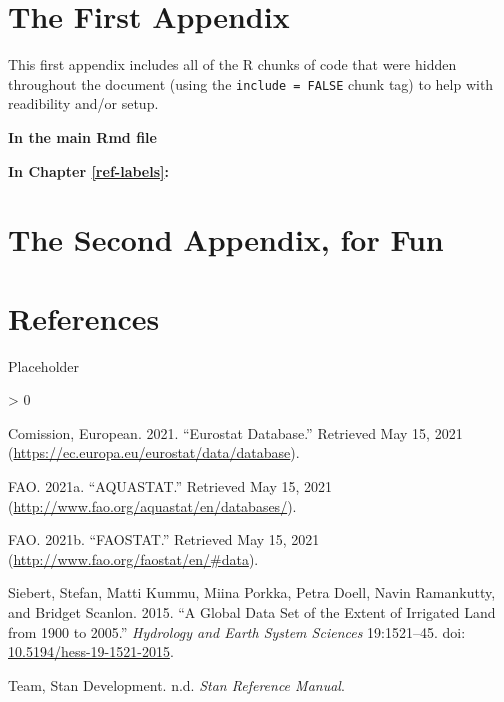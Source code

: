 \documentclass[12pt,twoside]{reedthesis}
\newlength{\cslhangindent}
\newenvironment{CSLReferences}[2] %
 {%
  \setlength{\parindent}{0pt}
  \ifodd #1 \everypar{\setlength{\hangindent}{\cslhangindent}}\ignorespaces\fi
  \ifnum #2 > 0
  \setlength{\parskip}{#2\baselineskip}
  \fi
 }%
 {}
\begin{document}
\appendix

\hypertarget{the-first-appendix}{%
\chapter{The First Appendix}\label{the-first-appendix}}

This first appendix includes all of the R chunks of code that were hidden throughout the document (using the \texttt{include\ =\ FALSE} chunk tag) to help with readibility and/or setup.

\textbf{In the main Rmd file}

\textbf{In Chapter \ref{ref-labels}:}

\hypertarget{the-second-appendix-for-fun}{%
\chapter{The Second Appendix, for Fun}\label{the-second-appendix-for-fun}}

\hypertarget{references}{%
\chapter*{References}\label{references}}

Placeholder

\hypertarget{refs}{}
\begin{CSLReferences}{1}{0}
\leavevmode\hypertarget{ref-europeancomissionEurostatDatabase2021}{}%
Comission, European. 2021. {``Eurostat {Database}.''} Retrieved May 15, 2021 (\url{https://ec.europa.eu/eurostat/data/database}).

\leavevmode\hypertarget{ref-faoAQUASTAT2021}{}%
FAO. 2021a. {``{AQUASTAT}.''} Retrieved May 15, 2021 (\url{http://www.fao.org/aquastat/en/databases/}).

\leavevmode\hypertarget{ref-faoFAOSTAT2021}{}%
FAO. 2021b. {``{FAOSTAT}.''} Retrieved May 15, 2021 (\url{http://www.fao.org/faostat/en/\#data}).

\leavevmode\hypertarget{ref-siebertGlobalDataSet2015}{}%
Siebert, Stefan, Matti Kummu, Miina Porkka, Petra Doell, Navin Ramankutty, and Bridget Scanlon. 2015. {``A Global Data Set of the Extent of Irrigated Land from 1900 to 2005.''} \emph{Hydrology and Earth System Sciences} 19:1521--45. doi: \href{https://doi.org/10.5194/hess-19-1521-2015}{10.5194/hess-19-1521-2015}.

\leavevmode\hypertarget{ref-teamStanReferenceManual}{}%
Team, Stan Development. n.d. \emph{Stan {Reference Manual}}.

\end{CSLReferences}

\end{document}
